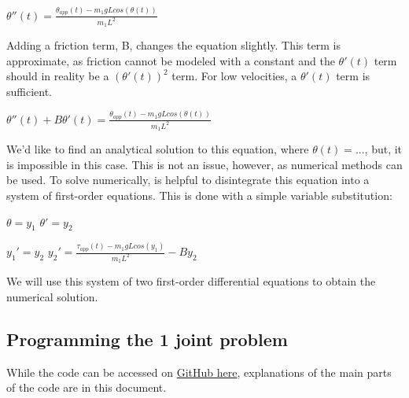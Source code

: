 \documentclass{article}
\begin{document}
\centering $\theta''(t) = \frac{\theta_{app}(t) - m_1gLcos(\theta(t))}{m_1L^2}$

\vspace{24pt}

\noindent \justifying Adding a friction term, B, changes the equation slightly. This term is approximate, as friction cannot be modeled with a constant and the $\theta'(t)$ term should in reality be a $(\theta'(t))^2$ term. For low velocities, a $\theta'(t)$ term is sufficient.

\vspace{24pt}

\centering $\theta''(t) + B\theta'(t) = \frac{\theta_{app}(t) - m_1gLcos(\theta(t))}{m_1L^2}$

\vspace{24pt}

\noindent \justifying We'd like to find an analytical solution to this equation, where $\theta(t) = ...$, but, it is impossible in this case. This is not an issue, however, as numerical methods can be used. To solve numerically, is helpful to disintegrate this equation into a system of first-order equations. This is done with a simple variable substitution:

\vspace{24pt}
\centering $\theta = y_1$    $\theta' = y_2$

\vspace{11pt}

\centering $y_1' = y_2$   \hspace{1cm}  $y_2' = \frac{\tau_{app}(t) - m_1gLcos(y_1)}{m_1L^2} - By_2$

\vspace{24pt}

\noindent \justifying We will use this system of two first-order differential equations to obtain the numerical solution.


\subsection{Programming the 1 joint problem}
While the code can be accessed on \textcolor{blue}{\href{https://github.com/natebechard/Robotic-Arm-Simulation-From-First-Principles/blob/main/1_joint_problem.py}{GitHub here}}, explanations of the main parts of the code are in this document. 

\vspace{24pt}
\end{document}
